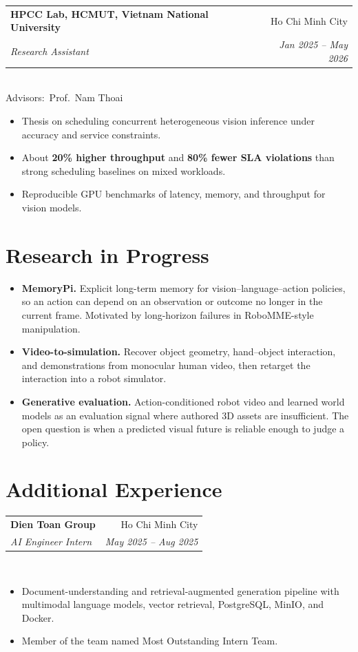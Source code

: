 \documentclass[letterpaper,11pt]{article}
\makeatletter
\newcommand{\role}[4]{%
  \Needspace{4\baselineskip}
  \vspace{4pt}
  \begin{tabular*}{\linewidth}{@{}l@{\extracolsep{\fill}}r@{}}
    \textbf{#1} & \textcolor{muted}{#2} \\[1pt]
    \textit{#3} & \textcolor{muted}{\textit{#4}} \\
  \end{tabular*}\\[1pt]
}
\newcommand{\advisors}[1]{%
  {\small\textcolor{muted}{Advisors:}\ #1}\par\vspace{1pt}
}
\makeatother
\begin{document}
\role
  {HPCC Lab, HCMUT, Vietnam National University}
  {Ho Chi Minh City}
  {Research Assistant}
  {Jan 2025 -- May 2026}
\advisors{Prof.\ Nam Thoai}

\begin{itemize}
  \item Thesis on scheduling concurrent heterogeneous vision inference under accuracy and service constraints.
  \item About \textbf{20\% higher throughput} and \textbf{80\% fewer SLA violations} than strong scheduling baselines on mixed workloads.
  \item Reproducible GPU benchmarks of latency, memory, and throughput for vision models.
\end{itemize}

\section*{Research in Progress}

\begin{itemize}
  \item \textbf{MemoryPi.} Explicit long-term memory for vision--language--action policies, so an action can depend on an observation or outcome no longer in the current frame. Motivated by long-horizon failures in RoboMME-style manipulation.
  \item \textbf{Video-to-simulation.} Recover object geometry, hand--object interaction, and demonstrations from monocular human video, then retarget the interaction into a robot simulator.
  \item \textbf{Generative evaluation.} Action-conditioned robot video and learned world models as an evaluation signal where authored 3D assets are insufficient. The open question is when a predicted visual future is reliable enough to judge a policy.
\end{itemize}

\section*{Additional Experience}

\role
  {Dien Toan Group}
  {Ho Chi Minh City}
  {AI Engineer Intern}
  {May 2025 -- Aug 2025}

\begin{itemize}
  \item Document-understanding and retrieval-augmented generation pipeline with multimodal language models, vector retrieval, PostgreSQL, MinIO, and Docker.
  \item Member of the team named Most Outstanding Intern Team.
\end{itemize}
\end{document}
